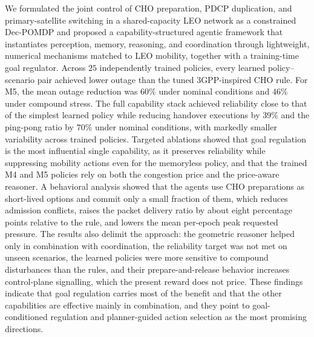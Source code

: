 \documentclass[journal]{IEEEtran}
\begin{document}
We formulated the joint control of CHO preparation, PDCP duplication, and
primary-satellite switching in a shared-capacity LEO network as a constrained
Dec-POMDP and proposed a capability-structured agentic framework that
instantiates perception, memory, reasoning, and coordination through
lightweight, numerical mechanisms matched to LEO mobility, together with a
training-time goal regulator. Across $25$ independently trained policies,
every learned policy--scenario pair achieved lower outage than the tuned
3GPP-inspired CHO rule. For M5, the mean outage reduction was $60\%$
under nominal conditions and $46\%$ under compound stress. The full
capability stack achieved reliability close to that of the simplest
learned policy while reducing handover executions by $39\%$ and the
ping-pong ratio by $70\%$ under nominal conditions, with markedly smaller
variability across trained policies. Targeted ablations showed that goal
regulation is the most influential single capability, as it preserves
reliability while suppressing mobility actions even for the memoryless policy,
and that the trained M4 and M5 policies rely on both the congestion price and
the price-aware reasoner.
A behavioral analysis showed that the agents use CHO preparations as
short-lived options and commit only a small fraction of them, which reduces
admission conflicts, raises the packet delivery ratio by about eight
percentage points relative to the rule, and lowers the mean per-epoch peak requested pressure.
The results also delimit the approach: the geometric reasoner helped only in
combination with coordination, the reliability target was not met on unseen scenarios, the learned policies
were more sensitive to compound disturbances than the rules, and their
prepare-and-release behavior increases control-plane signalling, which the
present reward does not price. These findings indicate that goal regulation carries most of the benefit and
that the other capabilities are effective mainly in combination, and they
point to goal-conditioned regulation and planner-guided action selection as
the most promising directions.
\end{document}
